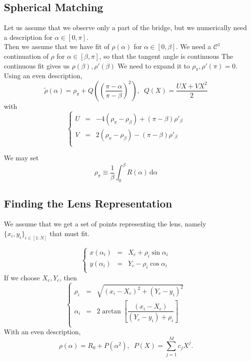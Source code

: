 \documentclass[aps,onecolumn]{revtex4}
\begin{document}
\subsection{Spherical Matching}
Let us assume that we observe only a part of the bridge, but we numerically need
a description for $\alpha\in[0,\pi]$.\\

Then we assume that we have fit of $\rho(\alpha)$ for $\alpha\in[0,\beta]$.
We need a $\mathcal{C}^1$ continuation of $\rho$ for $\alpha\in[\beta,\pi]$, so
that the tangent angle is continuous
The continuous fit gives us $\rho(\beta),\rho'(\beta)$
We need to expand it to $\rho_\pi,\rho'(\pi)=0$.
Using an even description,
\begin{equation}
	\tilde{\rho}(\alpha) = \rho_\pi + Q\left( \left(\dfrac{\pi-\alpha}{\pi-\beta}\right)^2 \right)
	, \;\; Q(X) = \dfrac{UX+VX^2}{2}
\end{equation}
with
\begin{equation}
\left\lbrace
	\begin{array}{rcl}
	U & = & -4\left(\rho_\pi-\rho_\beta\right)+\left(\pi-\beta\right) \rho'_\beta\\
	V & = & 2\left(\rho_\pi-\rho_\beta\right)-\left(\pi-\beta\right) \rho'_\beta \\
	\end{array}
\right.
\end{equation}

We may set 
\begin{equation}
	\rho_\pi \equiv \dfrac{1}{\beta}\int_0^\beta R(\alpha)\,\mathrm{d}\alpha
\end{equation}

\subsection{Finding the Lens Representation}
We assume that we get a set of points representing the lens, namely $\lbrace x_i,y_i \rbrace_{i\in[1:N]}$ that must
fit.

\begin{equation}
	\left\lbrace
		\begin{array}{rcl}
	x(\alpha_i) & = & X_c + \rho_i\sin\alpha_i\\
	y(\alpha_i) & = & Y_c - \rho_i\cos\alpha_i\\
		\end{array}
	\right.
\end{equation}
If we choose $X_c,Y_c$, then
\begin{equation}
	\left\lbrace
	\begin{array}{rcl}	
	\rho_i   &=&\sqrt{\left(x_i-X_c\right)^2+\left(Y_c-y_i\right)^2}\\
	\alpha_i &=& 2 \arctan\left[ \dfrac{\left(x_i-X_c\right)}{\left(Y_c-y_i\right)+\rho_i}\right]\\
	\end{array}
	\right.
\end{equation}
With an even description,
\begin{equation}
	\rho(\alpha) = R_0 + P(\alpha^2),\;\; P(X) = \sum_{j=1}^{M} c_j X^j.
\end{equation}
\end{document}
